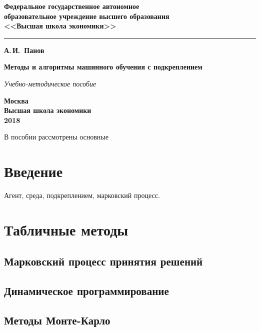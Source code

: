\documentclass[11pt]{memoir}
\begin{document}
	\pagestyle{empty}
		\begin{center}
			{\bfseries  Федеральное государственное автономное \\
				образовательное учреждение высшего образования\\
				<<Высшая школа экономики>>
				
			}

			\vspace{-5pt}
			\noindent\rule{\textwidth}{2pt}
			
			\vspace{50pt}
			{\Large\bfseries А.\,И.~Панов}
			
			\vspace{100pt}
			{\Huge\bfseries Методы и алгоритмы машинного обучения с подкреплением}
			
			\vspace{20pt}
			{\Large\itshape Учебно-методическое пособие}
			
			\vfill
			{\bfseries Москва\\
				Высшая школа экономики\\
				2018
			}
		\end{center}

	
	\frontmatter
	
	В пособии рассмотрены основные 
	
	\clearpage
	\tableofcontents %
		
	\mainmatter
	
	\chapter*{Введение}
	Агент, среда, подкреплением, марковский процесс.

	\chapter{Табличные методы}
	\section{Марковский процесс принятия решений}
	
	\section{Динамическое программирование}

	\section{Методы Монте-Карло}
	
\end{document}
